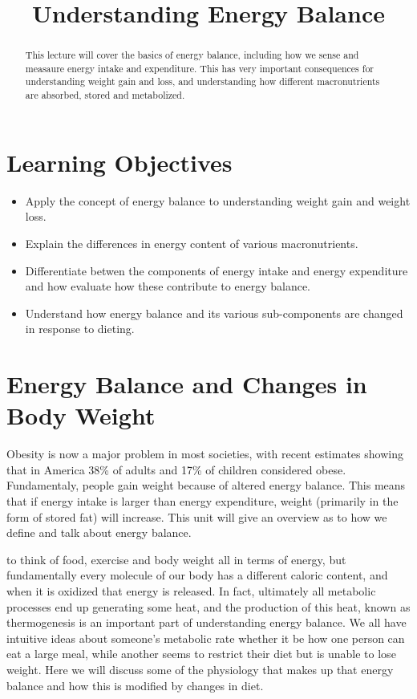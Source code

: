 \documentclass{tufte-handout}
\title{Understanding Energy Balance}
\author{}
\date{}  %
\begin{document}
\maketitle%

\begin{abstract}
\noindent This lecture will cover the basics of energy balance, including how we sense and measaure energy intake and expenditure.  This has very important consequences for understanding weight gain and loss, and understanding how different macronutrients are absorbed, stored and metabolized.
\end{abstract}

\tableofcontents

\pagebreak
\section{Learning Objectives}

\begin{itemize}
\item Apply the concept of energy balance to understanding weight gain and weight loss.
\item Explain the differences in energy content of various macronutrients.
\item Differentiate betwen the components of energy intake and energy expenditure and how evaluate how these contribute to energy balance.
\item Understand how energy balance and its various sub-components are changed in response to dieting.

\end{itemize}


\section{Energy Balance and Changes in Body Weight}

Obesity is now a major problem in most societies, with recent estimates showing that in America 38\% of adults\cite{Flegal2016} and 17\% of children \cite{Ogden2016} considered obese.  Fundamentaly, people gain weight because of altered energy balance.  This means that if energy intake is larger than energy expenditure, weight (primarily in the form of stored fat) will increase.  This unit will give an overview as to how we define and talk about energy balance.

 to think of food, exercise and body weight all in terms of energy, but fundamentally every molecule of our body has a different caloric content, and when it is oxidized that energy is released.  In fact, ultimately all metabolic processes end up generating some heat, and the production of this heat, known as thermogenesis is an important part of understanding energy balance.  We all have intuitive ideas about someone's metabolic rate whether it be how one person can eat a large meal, while another seems to restrict their diet but is unable to lose weight.  Here we will discuss some of the physiology that makes up that energy balance and how this is modified by changes in diet.
\end{document}
